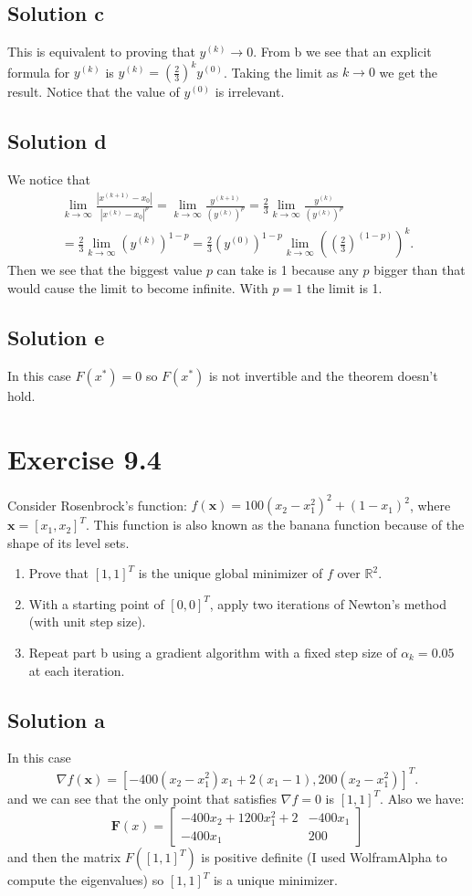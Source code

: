 \documentclass{article}
\newcommand{\bld}[1]{\boldsymbol{#1}}
\begin{document}
\subsection*{Solution c}
This is equivalent to proving that $y^{(k)}\to 0$. From b we see that an
explicit formula for $y^{(k)}$ is $y^{(k)}=\left(\frac{2}{3}\right)^ky^{(0)}$.
Taking the limit as $k\to 0$ we get the result. Notice that the value of
$y^{(0)}$ is irrelevant.
\subsection*{Solution d}
We notice that
\begin{multline*}
	\lim_{k\to \infty} \frac{|x^{(k+1)}-x_0|}{|x^{(k)}-x_0|^p} = \lim_{k\to
	\infty}\frac{y^{(k+1)}}{\left(y^{(k)}\right)^p}=
\frac{2}{3}\lim_{k\to\infty}\frac{y^{(k)}}{(y^{(k)})^p}\\
= \frac{2}{3}\lim_{k\to\infty}(y^{(k)})^{1-p} =
\frac{2}{3}(y^{(0)})^{1-p}\lim_{k\to\infty}\left(\left(\frac{2}{3}\right)^{(1-p)}\right)^k.
\end{multline*}
Then we see that the biggest value $p$ can take is 1 because any $p$ bigger
than that would cause the limit to become infinite. With $p=1$ the limit is 1.
\subsection*{Solution e}
In this case $F(x^*)=0$ so $F(x^*)$ is not invertible and the theorem doesn't
hold.
\section*{Exercise 9.4}
Consider Rosenbrock's function: $f(\bld{x})=100(x_2-x_1^2)^2+(1-x_1)^2$, where
$\bld{x}=[x_1,x_2]^T$. This function is also known as the banana function
because of the shape of its level sets.
\begin{enumerate}[label=\alph*.]
\item Prove that $[1,1]^T$ is the unique global minimizer of $f$ over
	$\mathbb{R}^2$.
\item With a starting point of $[0,0]^T$, apply two iterations of Newton's
	method (with unit step size).
\item Repeat part b using a gradient algorithm with a fixed step size of
	$\alpha_k=0.05$ at each iteration.
\end{enumerate}
\subsection*{Solution a}
In this case
\[
	\nabla f(\bld{x})=[-400(x_2-x_1^2)x_1+2(x_1-1),200(x_2-x_1^2)]^T.
\]
and we can see that the only point that satisfies $\nabla f=0$ is $[1,1]^T$.
Also we have:
\[
	\bld{F}(x)=\begin{bmatrix}
		-400x_2 + 1200x_1^2 + 2 & -400x_1 \\
		-400x_1 & 200
	\end{bmatrix}
\]
and then the matrix $F([1,1]^T)$ is positive definite (I used WolframAlpha to
compute the eigenvalues) so $[1,1]^T$ is a unique minimizer.
\end{document}
